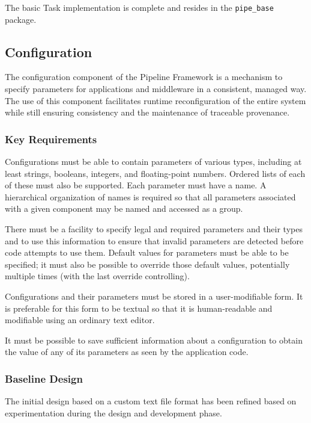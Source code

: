 \documentclass[DM,lsstdraft,toc]{lsstdoc}
\begin{document}
The basic Task implementation is complete and resides in the
\texttt{pipe\_base} package.

\subsection{Configuration}\label{configuration}

The configuration component of the Pipeline Framework is a mechanism to
specify parameters for applications and middleware in a consistent,
managed way. The use of this component facilitates runtime
reconfiguration of the entire system while still ensuring consistency
and the maintenance of traceable provenance.

\subsubsection{Key Requirements}\label{configuration-reqs}

Configurations must be able to contain parameters of various types,
including at least strings, booleans, integers, and floating-point
numbers. Ordered lists of each of these must also be supported. Each
parameter must have a name. A hierarchical organization of names is
required so that all parameters associated with a given component may be
named and accessed as a group.

There must be a facility to specify legal and required parameters and
their types and to use this information to ensure that invalid
parameters are detected before code attempts to use them. Default values
for parameters must be able to be specified; it must also be possible to
override those default values, potentially multiple times (with the last
override controlling).

Configurations and their parameters must be stored in a user-modifiable
form. It is preferable for this form to be textual so that it is
human-readable and modifiable using an ordinary text editor.

It must be possible to save sufficient information about a configuration
to obtain the value of any of its parameters as seen by the application
code.

\subsubsection{Baseline Design}\label{configuration-design}

The initial design based on a custom text file format has been refined
based on experimentation during the design and development phase.
\end{document}
